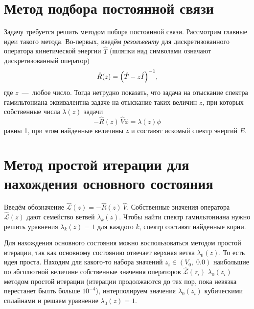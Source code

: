 \documentclass[10pt]{article}
\begin{document}
\section{Метод подбора постоянной связи}

Задачу требуется решить методом побора постоянной связи. Рассмотрим главные идеи такого метода. Во-первых, введём \emph{резольвенту} для дискретизованного оператора кинетической энергии  $\hat T$ (шляпки над символами означают дискретизованный оператор)
\begin{equation}
 \hat R(z) = \qty(\hat T - z \hat I)^{-1},
\end{equation}
где $z$~---~любое число. Тогда нетрудно показать, что задача на отыскание спектра гамильтониана эквивалентна задаче на отыскание таких величин $z$, при которых собственные числа $\lambda(z)$ задачи
\begin{equation}
 - \hat R(z)\, \hat V \phi = \lambda(z) \phi
\end{equation}
равны 1, при этом найденные величины $z$ и составят искомый спектр энергий $E$.

\section{Метод простой итерации для нахождения основного состояния}

Введём обозначение $ \hat{\mathcal{L}}(z) = - \hat R(z)\, \hat V$. Собственные значения оператора $\hat{\mathcal{L}}(z)$ дают семейство ветвей $\lambda_k(z)$. Чтобы найти спектр гамильтониана нужно решить уравнения $\lambda_k(z)=1$ для каждого $k$, спектр составят найденные корни.

Для нахождения основного состояния можно воспользоваться методом простой итерации, так как основному состоянию отвечает верхняя ветка  $\lambda_0(z)$. То есть идея проста. Находим для какого-то набора значений ${z_i} \in (V_0,\; 0.0)$ наибольшие по абсолютной величине собственные значения операторов $\hat{\mathcal{L}}(z_i)$ $\lambda_0(z_i)$ методом простой итерации (итерации продолжаются до тех пор, пока невязка перестанет былть больше $10^{-4}$), интерполируем значения $\lambda_0(z_i)$ кубическими сплайнами и решаем уравнение $\lambda_0(z)=1$.
\end{document}
